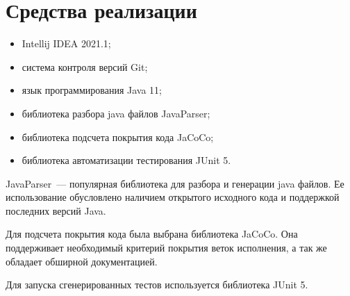 \section{Средства реализации} \label{sub22}


\begin{itemize} 
\item{Intellij IDEA 2021.1;}	
\item{система контроля версий Git;}
\item{язык программирования Java 11;}
\item{библиотека разбора java файлов JavaParser;}
\item{библиотека подсчета покрытия кода JaCoCo;}
\item{библиотека автоматизации тестирования JUnit 5.}
\end{itemize}

JavaParser~--- популярная библиотека для разбора и генерации java файлов. Ее использование обусловлено наличием открытого исходного кода и поддержкой последних версий Java. 

Для подсчета покрытия кода была выбрана библиотека JaCoCo. Она поддерживает необходимый критерий покрытия веток исполнения, а так же обладает обширной документацией.

Для запуска сгенерированных тестов используется библиотека JUnit 5. 